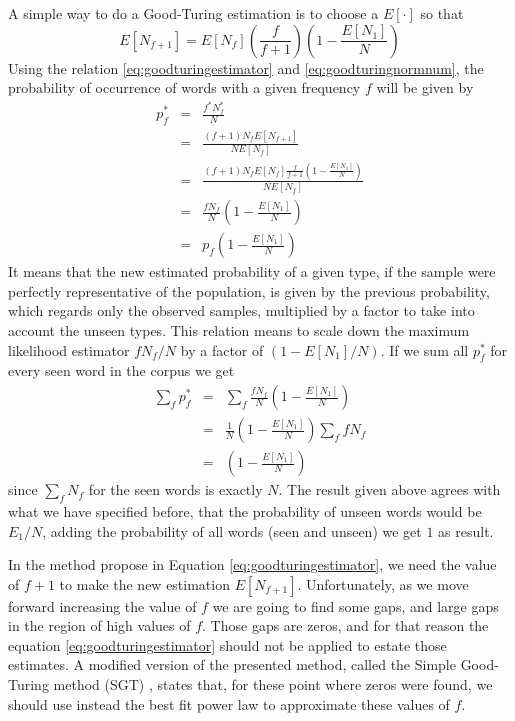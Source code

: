 A simple way to do a Good-Turing estimation \citep{galesampson95} is to choose a $E[\cdot]$ so that
\begin{equation}
\label{eq:goodturingestimator}
E[N_{f+1}] = E[N_f] \left( \frac{f}{f+1} \right) \left( 1 - \frac{E[N_1]}{N} \right)
\end{equation}
Using the relation \ref{eq:goodturingestimator} and \ref{eq:goodturingnormnum}, 
the probability of occurrence of words with a given frequency $f$
will be given by
\begin{eqnarray}
p^\ast_f &=& \frac{f^\ast N_f^\ast}{N} \nonumber \\
    &=& \frac{(f+1) N_f E[N_{f+1}]}{N E[N_f]} \nonumber \\
    &=& \frac{(f+1) N_f E[N_f] \frac{f}{f+1} \left( 1 - \frac{E[N_1]}{N} \right)}{N E[N_f]} \nonumber \\
    &=& \frac{f N_f}{N} \left( 1 - \frac{E[N_1]}{N} \right) \nonumber \\
    &=& p_f \left( 1 - \frac{E[N_1]}{N} \right)
\end{eqnarray}
It means that the new estimated probability of a given type, if the sample were
perfectly representative of the population, is given by the previous probability,
which regards only the observed samples, multiplied by a factor to take into account 
the unseen types.
This relation means to scale down the maximum likelihood estimator $f N_f/N$ by a factor of $(1 - E[N_1]/N)$.
If we sum all $p^\ast_f$ for every seen word in the corpus we get
\begin{eqnarray}
\sum_f p^\ast_f &=& \sum_f \frac{f N_f}{N} \left( 1 - \frac{E[N_1]}{N} \right) \nonumber \\
           &=& \frac{1}{N} \left( 1 - \frac{E[N_1]}{N} \right) \sum_f f N_f \nonumber \\
           &=& \left( 1 - \frac{E[N_1]}{N} \right)
\end{eqnarray}
since $\sum_f N_f$ for the seen words is exactly $N$. The result given above agrees with
what we have specified before, that the probability of unseen words would be $E_1/N$,
adding the probability of all words (seen and unseen) we get $1$ as result. 

In the method propose in Equation \ref{eq:goodturingestimator}, we need the value of 
$f+1$ to make the new estimation $E[N_{f+1}]$. Unfortunately, as we move forward
increasing the value of $f$ we are going to find some gaps, and large gaps
in the region of high values of $f$. Those gaps are zeros, and for that reason
the equation \ref{eq:goodturingestimator} should not be applied to estate those estimates.
A modified version of the presented method, called the Simple Good-Turing method (SGT) \citep{gale1994},
states that, for these point where zeros were found, we should use instead the best fit power law
to approximate these values of $f$.

